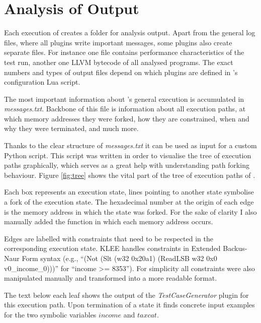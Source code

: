 \section{Analysis of \sse Output}\label{sec:ana}

Each execution of \sse creates a folder for analysis output.
Apart from the general log files, where all plugins write important messages, some plugins also create separate files.
For instance one file contains performance characteristics of the test run, another one LLVM bytecode of all analysed programs.
The exact numbers and types of output files depend on which plugins are defined in \sse's configuration Lua script.

The most important information about \sse's general execution is accumulated in \textit{messages.txt}.
Backbone of this file is information about all execution paths, at which memory addresses they were forked, how they are constrained, when and why they were terminated, and much more.

Thanks to the clear structure of \textit{messages.txt} it can be used as input for a custom Python script. This script was written in order to visualise the tree of execution paths graphically, which serves as a great help with understanding path forking behaviour.
Figure \ref{fig:tree} shows the vital part of the tree of execution paths of \app.

Each box represents an execution state, lines pointing to another state symbolise a fork of the execution state.
The hexadecimal number at the origin of each edge is the memory address in which the state was forked.
For the sake of clarity I also manually added the function in which each memory address occurs.

Edges are labelled with constraints that need to be respected in the corresponding execution state.
KLEE handles constraints in Extended Backus-Naur Form syntax (e.g., ``(Not (Slt (w32 0x20a1) (ReadLSB w32 0x0 v0\_income\_0)))'' for ``income >= 8353'').
For simplicity all constraints were also manipulated manually and transformed into a more readable format.

The text below each leaf shows the output of the \textit{TestCaseGenerator} plugin for this execution path.
Upon termination of a state it finds concrete input examples for the two symbolic variables $income$ and $taxcat$.

\bigskip

